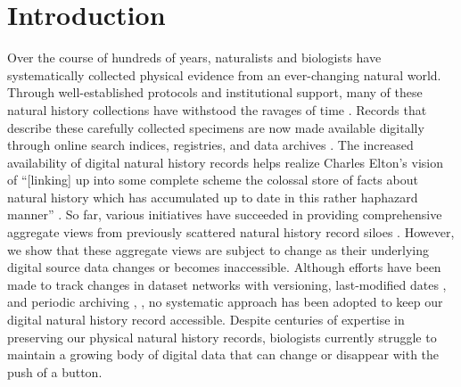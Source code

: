 \section*{Introduction}
Over the course of hundreds of years, naturalists and biologists have systematically collected physical evidence from an ever-changing natural world. Through well-established protocols and institutional support, many of these natural history collections have withstood the ravages of time \citep{Hortal_2015,Davis_1996}. Records that describe these carefully collected specimens are now made available digitally through online search indices, registries, and data archives \citep{Page_2015}. The increased availability of digital natural history records helps realize Charles Elton's vision of ``[linking] up into some complete scheme the colossal store of facts about natural history which has accumulated up to date in this rather haphazard manner'' \citep{Elton_1927}. So far, various initiatives have succeeded in providing comprehensive aggregate views from previously scattered natural history record siloes . However, we show that these aggregate views are subject to change as their underlying digital source data changes or becomes inaccessible. Although efforts have been made to track changes in dataset networks with versioning, last-modified dates \citep{Wieczorek_2012,Robertson_2014}, and periodic archiving \citep{Costello_2013}, , no systematic approach has been adopted to keep our digital natural history record accessible. Despite centuries of expertise in preserving our physical natural history records, biologists currently struggle to maintain a growing body of digital data that can change or disappear with the push of a button.

